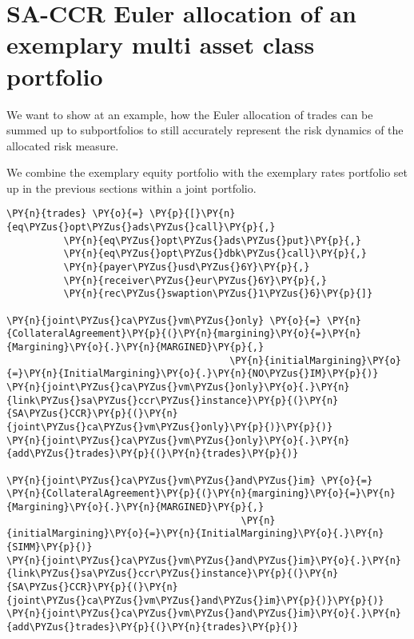    

    
    \hypertarget{sa-ccr-euler-allocation-of-an-exemplary-multi-asset-class-portfolio}{%
\section{SA-CCR Euler allocation of an exemplary multi asset class
portfolio}\label{sa-ccr-euler-allocation-of-an-exemplary-multi-asset-class-portfolio}}

We want to show at an example, how the Euler allocation of trades can be
summed up to subportfolios to still accurately represent the risk
dynamics of the allocated risk measure.

We combine the exemplary equity portfolio with the exemplary rates
portfolio set up in the previous sections within a joint portfolio.

    \begin{tcolorbox}[breakable, size=fbox, boxrule=1pt, pad at break*=1mm,colback=cellbackground, colframe=cellborder]
\begin{Verbatim}[commandchars=\\\{\}]
\PY{n}{trades} \PY{o}{=} \PY{p}{[}\PY{n}{eq\PYZus{}opt\PYZus{}ads\PYZus{}call}\PY{p}{,}
          \PY{n}{eq\PYZus{}opt\PYZus{}ads\PYZus{}put}\PY{p}{,}
          \PY{n}{eq\PYZus{}opt\PYZus{}dbk\PYZus{}call}\PY{p}{,}
          \PY{n}{payer\PYZus{}usd\PYZus{}6Y}\PY{p}{,}
          \PY{n}{receiver\PYZus{}eur\PYZus{}6Y}\PY{p}{,}
          \PY{n}{rec\PYZus{}swaption\PYZus{}1\PYZus{}6}\PY{p}{]}

\PY{n}{joint\PYZus{}ca\PYZus{}vm\PYZus{}only} \PY{o}{=} \PY{n}{CollateralAgreement}\PY{p}{(}\PY{n}{margining}\PY{o}{=}\PY{n}{Margining}\PY{o}{.}\PY{n}{MARGINED}\PY{p}{,}
                                       \PY{n}{initialMargining}\PY{o}{=}\PY{n}{InitialMargining}\PY{o}{.}\PY{n}{NO\PYZus{}IM}\PY{p}{)}
\PY{n}{joint\PYZus{}ca\PYZus{}vm\PYZus{}only}\PY{o}{.}\PY{n}{link\PYZus{}sa\PYZus{}ccr\PYZus{}instance}\PY{p}{(}\PY{n}{SA\PYZus{}CCR}\PY{p}{(}\PY{n}{joint\PYZus{}ca\PYZus{}vm\PYZus{}only}\PY{p}{)}\PY{p}{)}
\PY{n}{joint\PYZus{}ca\PYZus{}vm\PYZus{}only}\PY{o}{.}\PY{n}{add\PYZus{}trades}\PY{p}{(}\PY{n}{trades}\PY{p}{)}

\PY{n}{joint\PYZus{}ca\PYZus{}vm\PYZus{}and\PYZus{}im} \PY{o}{=} \PY{n}{CollateralAgreement}\PY{p}{(}\PY{n}{margining}\PY{o}{=}\PY{n}{Margining}\PY{o}{.}\PY{n}{MARGINED}\PY{p}{,}
                                         \PY{n}{initialMargining}\PY{o}{=}\PY{n}{InitialMargining}\PY{o}{.}\PY{n}{SIMM}\PY{p}{)}
\PY{n}{joint\PYZus{}ca\PYZus{}vm\PYZus{}and\PYZus{}im}\PY{o}{.}\PY{n}{link\PYZus{}sa\PYZus{}ccr\PYZus{}instance}\PY{p}{(}\PY{n}{SA\PYZus{}CCR}\PY{p}{(}\PY{n}{joint\PYZus{}ca\PYZus{}vm\PYZus{}and\PYZus{}im}\PY{p}{)}\PY{p}{)}
\PY{n}{joint\PYZus{}ca\PYZus{}vm\PYZus{}and\PYZus{}im}\PY{o}{.}\PY{n}{add\PYZus{}trades}\PY{p}{(}\PY{n}{trades}\PY{p}{)}
\end{Verbatim}
\end{tcolorbox}

